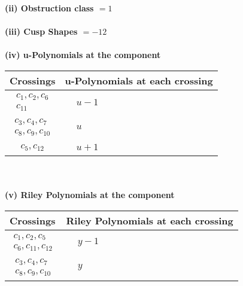 \documentclass[1p]{elsarticle_modified}
\theoremstyle{definition}
\begin{document}
\flushleft \textbf{(ii) Obstruction class $= 1$}\\~\\
\flushleft \textbf{(iii) Cusp Shapes $= -12$}\\~\\
\newpage\renewcommand{\arraystretch}{1}
\flushleft \textbf{(iv) u-Polynomials at the component}\newline \\
\begin{tabular}{m{50pt}|m{274pt}}
Crossings & \hspace{64pt}u-Polynomials at each crossing \\
\hline $$\begin{aligned}c_{1},c_{2},c_{6}\\c_{11}\end{aligned}$$&$\begin{aligned}
&u-1
\end{aligned}$\\
\hline $$\begin{aligned}c_{3},c_{4},c_{7}\\c_{8},c_{9},c_{10}\end{aligned}$$&$\begin{aligned}
&u
\end{aligned}$\\
\hline $$\begin{aligned}c_{5},c_{12}\end{aligned}$$&$\begin{aligned}
&u+1
\end{aligned}$\\
\hline
\end{tabular}\\~\\
\newpage\renewcommand{\arraystretch}{1}
\flushleft \textbf{(v) Riley Polynomials at the component}\newline \\
\begin{tabular}{m{50pt}|m{274pt}}
Crossings & \hspace{64pt}Riley Polynomials at each crossing \\
\hline $$\begin{aligned}c_{1},c_{2},c_{5}\\c_{6},c_{11},c_{12}\end{aligned}$$&$\begin{aligned}
&y-1
\end{aligned}$\\
\hline $$\begin{aligned}c_{3},c_{4},c_{7}\\c_{8},c_{9},c_{10}\end{aligned}$$&$\begin{aligned}
&y
\end{aligned}$\\
\hline
\end{tabular}\\~\\
\end{document}
